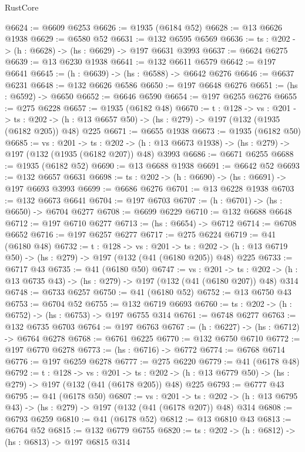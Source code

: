 \begin{lexlean}{RustCore}
\begin{coremodule}
@6624 := @6609 @6253
@6626 := @1935 (@6184 @52)
@6628 := @13 @6626 @1938
@6629 := @6580 @52
@6631 := @132 @6595 @6569
@6636 := {ts : @202} -> (h : @6628) -> (hs : @6629) -> @197 @6631 @3993
@6637 := @6624 @6275
@6639 := @13 @6230 @1938
@6641 := @132 @6611 @6579
@6642 := @197 @6641
@6645 := (h : @6639) -> (hs : @6588) -> @6642 @6276
@6646 := @6637 @6231
@6648 := @132 @6626 @6586
@6650 := @197 @6648 @6276
@6651 := (hs : @6592) -> @6650
@6652 := @6646 @6590
@6654 := @197 @6255 @6276
@6655 := @275 @6228
@6657 := @1935 (@6182 @48)
@6670 := {t : @128} ->
  {vs : @201} ->
  {ts : @202} -> (h : @13 @6657 @50) -> (hs : @279) -> @197 (@132 (@1935 (@6182 @205)) @48) @225
@6671 := @6655 @1938
@6673 := @1935 (@6182 @50)
@6685 := {vs : @201} ->
  {ts : @202} -> (h : @13 @6673 @1938) -> (hs : @279) -> @197 (@132 (@1935 (@6182 @207)) @48) @3993
@6686 := @6671 @6255
@6688 := @1935 (@6182 @52)
@6690 := @13 @6688 @1938
@6691 := @6642 @52
@6693 := @132 @6657 @6631
@6698 := {ts : @202} -> (h : @6690) -> (hs : @6691) -> @197 @6693 @3993
@6699 := @6686 @6276
@6701 := @13 @6228 @1938
@6703 := @132 @6673 @6641
@6704 := @197 @6703
@6707 := (h : @6701) -> (hs : @6650) -> @6704 @6277
@6708 := @6699 @6229
@6710 := @132 @6688 @6648
@6712 := @197 @6710 @6277
@6713 := (hs : @6654) -> @6712
@6714 := @6708 @6652
@6716 := @197 @6257 @6277
@6717 := @275 @6224
@6719 := @41 (@6180 @48)
@6732 := {t : @128} ->
  {vs : @201} ->
  {ts : @202} -> (h : @13 @6719 @50) -> (hs : @279) -> @197 (@132 (@41 (@6180 @205)) @48) @225
@6733 := @6717 @43
@6735 := @41 (@6180 @50)
@6747 := {vs : @201} ->
  {ts : @202} -> (h : @13 @6735 @43) -> (hs : @279) -> @197 (@132 (@41 (@6180 @207)) @48) @314
@6748 := @6733 @6257
@6750 := @41 (@6180 @52)
@6752 := @13 @6750 @43
@6753 := @6704 @52
@6755 := @132 @6719 @6693
@6760 := {ts : @202} -> (h : @6752) -> (hs : @6753) -> @197 @6755 @314
@6761 := @6748 @6277
@6763 := @132 @6735 @6703
@6764 := @197 @6763
@6767 := (h : @6227) -> (hs : @6712) -> @6764 @6278
@6768 := @6761 @6225
@6770 := @132 @6750 @6710
@6772 := @197 @6770 @6278
@6773 := (hs : @6716) -> @6772
@6774 := @6768 @6714
@6776 := @197 @6259 @6278
@6777 := @275 @6220
@6779 := @41 (@6178 @48)
@6792 := {t : @128} ->
  {vs : @201} ->
  {ts : @202} -> (h : @13 @6779 @50) -> (hs : @279) -> @197 (@132 (@41 (@6178 @205)) @48) @225
@6793 := @6777 @43
@6795 := @41 (@6178 @50)
@6807 := {vs : @201} ->
  {ts : @202} -> (h : @13 @6795 @43) -> (hs : @279) -> @197 (@132 (@41 (@6178 @207)) @48) @314
@6808 := @6793 @6259
@6810 := @41 (@6178 @52)
@6812 := @13 @6810 @43
@6813 := @6764 @52
@6815 := @132 @6779 @6755
@6820 := {ts : @202} -> (h : @6812) -> (hs : @6813) -> @197 @6815 @314

\end{coremodule}
\end{lexlean}
